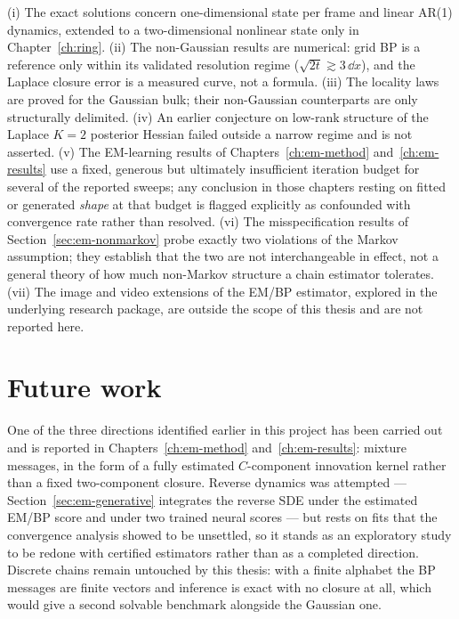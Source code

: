 (i) The exact solutions concern one-dimensional state per frame and
linear AR(1) dynamics, extended to a two-dimensional nonlinear state only
in Chapter~\ref{ch:ring}. (ii) The non-Gaussian results are numerical: grid
BP is a reference only within its validated resolution regime
($\sqrt{2t} \gtrsim 3\,\dd x$), and the Laplace closure error is a
measured curve, not a formula. (iii) The locality laws are proved for
the Gaussian bulk; their non-Gaussian counterparts are only structurally
delimited. (iv) An earlier conjecture on low-rank structure of the Laplace
$K = 2$ posterior Hessian failed outside a narrow regime and is not
asserted. (v) The EM-learning results of Chapters~\ref{ch:em-method}
and~\ref{ch:em-results} use a fixed, generous but ultimately insufficient
iteration budget for several of the reported sweeps; any conclusion in
those chapters resting on fitted or generated \emph{shape} at that budget
is flagged explicitly as confounded with convergence rate rather than
resolved. (vi) The misspecification results of
Section~\ref{sec:em-nonmarkov} probe exactly two violations of the Markov
assumption; they establish that the two are not interchangeable in effect,
not a general theory of how much non-Markov structure a chain estimator
tolerates. (vii) The image and video extensions of the EM/BP estimator,
explored in the underlying research package, are outside the scope of
this thesis and are not reported here.

\section{Future work}

One of the three directions identified earlier in this project has been
carried out and is reported in Chapters~\ref{ch:em-method}
and~\ref{ch:em-results}: mixture messages, in the form of a fully estimated
$C$-component innovation kernel rather than a fixed two-component closure.
Reverse dynamics was attempted --- Section~\ref{sec:em-generative} integrates
the reverse SDE under the estimated EM/BP score and under two trained neural
scores --- but rests on fits that the convergence analysis showed to be
unsettled, so it stands as an exploratory study to be redone with certified
estimators rather than as a completed direction. Discrete chains
remain untouched by this thesis: with a finite alphabet the BP messages are
finite vectors and inference is exact with no closure at all, which would
give a second solvable benchmark alongside the Gaussian one.

